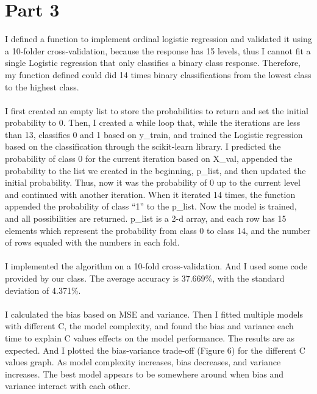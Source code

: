 \documentclass[10pt,onecolumn,letterpaper]{article}
\begin{document}
\section*{Part 3}
 I defined a function to implement ordinal logistic regression and validated it using a 10-folder cross-validation, because the response has 15 levels, thus I cannot fit a single Logistic regression that only classifies a binary class response. Therefore, my function defined could did 14 times binary classifications from the lowest class to the highest class.\\ \\
 I first created an empty list to store the probabilities to return and set the initial probability to 0. Then, I created a while loop that, while the iterations are less than 13, classifies 0 and 1 based on y\_train, and trained the Logistic regression based on the classification through the scikit-learn library. I predicted the probability of class 0 for the current iteration based on X\_val, appended the probability to the list we created in the beginning, p\_list, and then updated the initial probability. Thus, now it was the probability of 0 up to the current level and continued with another iteration. When it iterated 14 times, the function appended the probability of class “1” to the p\_list. Now the model is trained, and all possibilities are returned. p\_list is a 2-d array, and each row has 15 elements which represent the probability from class 0 to class 14, and the number of rows equaled with the numbers in each fold.\\\\
 I implemented the algorithm on a 10-fold cross-validation. And I used some code provided by our class. The average accuracy is 37.669\%, with the standard deviation of 4.371\%.\\\\
 I calculated the bias based on MSE and variance. Then I fitted multiple models with different C, the model complexity, and found the bias and variance each time to explain C values effects on the model performance. The results are as expected. And I plotted the bias-variance trade-off (Figure 6) for the different C values graph. As model complexity increases, bias decreases, and variance increases. The best model appears to be somewhere around when bias and variance interact with each other.  
\end{document}
